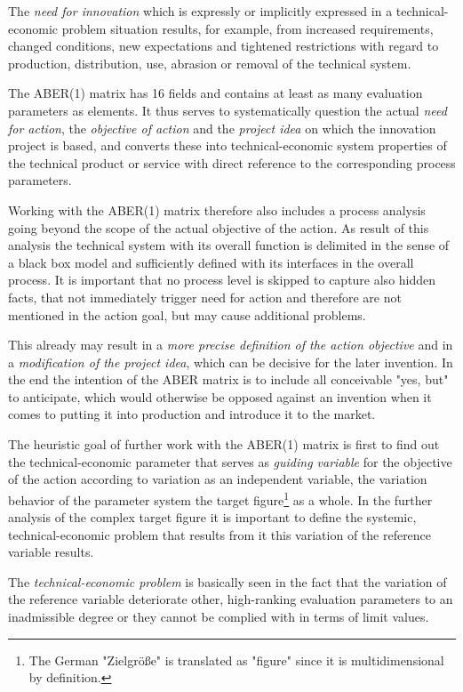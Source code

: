 \documentclass[11pt,a4paper]{article}
\begin{document}
The \emph{need for innovation} which is expressly or implicitly expressed in a
technical-economic problem situation results, for example, from increased
requirements, changed conditions, new expectations and tightened restrictions
with regard to production, distribution, use, abrasion or removal of the
technical system.

The ABER(1) matrix has 16 fields and contains at least as many evaluation
parameters as elements. It thus serves to systematically question the actual
\emph{need for action}, the \emph{objective of action} and the \emph{project
  idea} on which the innovation project is based, and converts these into
technical-economic system properties of the technical product or service with
direct reference to the corresponding process parameters.

Working with the ABER(1) matrix therefore also includes a process analysis
going beyond the scope of the actual objective of the action. As result of
this analysis the technical system with its overall function is delimited in
the sense of a black box model and sufficiently defined with its interfaces in
the overall process. It is important that no process level is skipped to
capture also hidden facts, that not immediately trigger need for action and
therefore are not mentioned in the action goal, but may cause additional
problems.

This already may result in a \emph{more precise definition of the action
  objective} and in a \emph{modification of the project idea}, which can be
decisive for the later invention. In the end the intention of the ABER matrix
is to include all conceivable "yes, but" to anticipate, which would otherwise
be opposed against an invention when it comes to putting it into production
and introduce it to the market.

The heuristic goal of further work with the ABER(1) matrix is first to find
out the technical-economic parameter that serves as \emph{guiding variable}
for the objective of the action according to variation as an independent
variable, the variation behavior of the parameter system the target
figure\footnote{The German "Zielgröße" is translated as "figure" since it is
  multidimensional by definition.} as a whole. In the further analysis of the
complex target figure it is important to define the systemic,
technical-economic problem that results from it this variation of the
reference variable results.

The \emph{technical-economic problem} is basically seen in the fact that the
variation of the reference variable deteriorate other, high-ranking evaluation
parameters to an inadmissible degree or they cannot be complied with in terms
of limit values.
\end{document}
